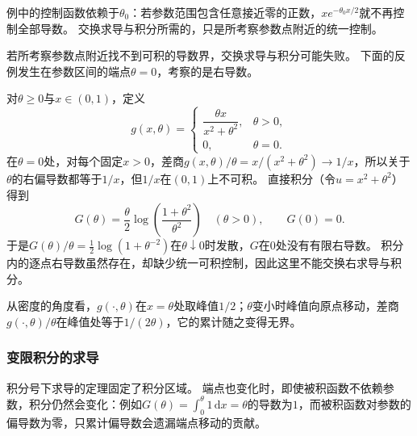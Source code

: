 例中的控制函数依赖于$\theta_0$：若参数范围包含任意接近零的正数，$xe^{-\theta_0x/2}$就不再控制全部导数。
交换求导与积分所需的，只是所考察参数点附近的统一控制。

若所考察参数点附近找不到可积的导数界，交换求导与积分可能失败。
下面的反例发生在参数区间的端点$\theta=0$，考察的是右导数。
\begin{example}[参数积分中的控制函数失效]
\label{ex:analysis-parameter-integral-failure}
对$\theta\geq0$与$x\in(0,1)$，定义
\[
 g(x,\theta)=
 \begin{cases}
 \dfrac{\theta x}{x^2+\theta^2}, & \theta>0,\\[5pt]
 0, & \theta=0.
 \end{cases}
\]
在$\theta=0$处，对每个固定$x>0$，差商$g(x,\theta)/\theta=x/(x^2+\theta^2)\to1/x$，所以关于$\theta$的右偏导数都等于$1/x$，但$1/x$在$(0,1)$上不可积。
直接积分（令$u=x^2+\theta^2$）得到
\[
 G(\theta)=\frac{\theta}{2}\log\left(\frac{1+\theta^2}{\theta^2}\right)\quad(\theta>0),
 \qquad G(0)=0.
\]
于是$G(\theta)/\theta=\frac12\log(1+\theta^{-2})$在$\theta\downarrow0$时发散，$G$在$0$处没有有限右导数。
积分内的逐点右导数虽然存在，却缺少统一可积控制，因此这里不能交换右求导与积分。
\end{example}

从密度的角度看，$g(\cdot,\theta)$在$x=\theta$处取峰值$1/2$；$\theta$变小时峰值向原点移动，差商$g(\cdot,\theta)/\theta$在峰值处等于$1/(2\theta)$，它的累计随之变得无界。

\subsubsection{变限积分的求导}

积分号下求导的定理固定了积分区域。
端点也变化时，即使被积函数不依赖参数，积分仍然会变化：例如$G(\theta)=\int_0^\theta1\,\mathrm dx=\theta$的导数为$1$，而被积函数对参数的偏导数为零，只累计偏导数会遗漏端点移动的贡献。

